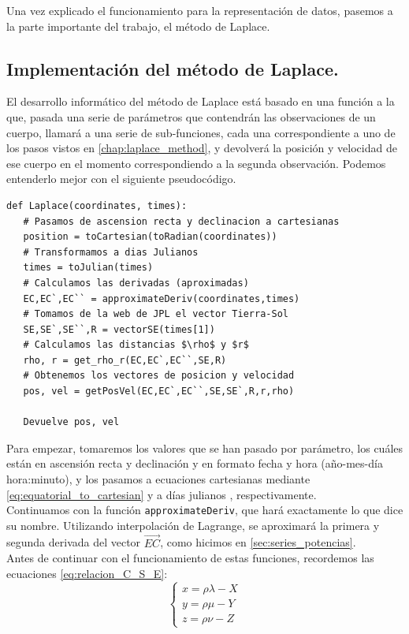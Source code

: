 Una vez explicado el funcionamiento para la representación de datos, pasemos a la parte importante del trabajo, el método de Laplace.\\

\subsection{Implementación del método de Laplace.}
\label{subsec:laplace_method_code}
El desarrollo informático del método de Laplace está basado en una función a la que, pasada una serie de parámetros que contendrán las observaciones de un cuerpo, llamará a una serie de sub-funciones, cada una correspondiente a uno de los pasos vistos en \ref{chap:laplace_method}, y devolverá la posición y velocidad de ese cuerpo en el momento correspondiendo a la segunda observación. Podemos entenderlo mejor con el siguiente pseudocódigo.
\begin{lstlisting}[style=PythonCode]
def Laplace(coordinates, times):
   # Pasamos de ascension recta y declinacion a cartesianas
   position = toCartesian(toRadian(coordinates))
   # Transformamos a dias Julianos
   times = toJulian(times)
   # Calculamos las derivadas (aproximadas)
   EC,EC`,EC`` = approximateDeriv(coordinates,times)
   # Tomamos de la web de JPL el vector Tierra-Sol
   SE,SE`,SE``,R = vectorSE(times[1])
   # Calculamos las distancias $\rho$ y $r$
   rho, r = get_rho_r(EC,EC`,EC``,SE,R)
   # Obtenemos los vectores de posicion y velocidad
   pos, vel = getPosVel(EC,EC`,EC``,SE,SE`,R,r,rho)
   
   Devuelve pos, vel
\end{lstlisting}

Para empezar, tomaremos los valores que se han pasado por parámetro, los cuáles están en ascensión recta y declinación y en formato fecha y hora (año-mes-día hora:minuto), y los pasamos a ecuaciones cartesianas mediante \eqref{eq:equatorial_to_cartesian} y a días julianos \cite{julian}, respectivamente.\\

Continuamos con la función \texttt{approximateDeriv}, que hará exactamente lo que dice su nombre. Utilizando interpolación de Lagrange, se aproximará la primera y segunda derivada del vector $\overrightarrow{EC}$, como hicimos en \ref{sec:series_potencias}.\\

Antes de continuar con el funcionamiento de estas funciones, recordemos las ecuaciones \eqref{eq:relacion_C_S_E}:
\[
\left\{
\begin{array}{l}
	x=\rho\lambda-X\\
	y=\rho\mu-Y\\
	z=\rho\nu-Z
\end{array}
\right.
\]

